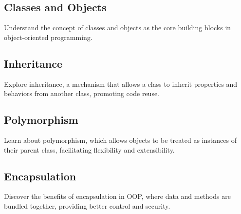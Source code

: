 \documentclass{article}
\begin{document}
\subsection{Classes and Objects}
Understand the concept of classes and objects as the core building blocks in object-oriented programming.

\subsection{Inheritance}
Explore inheritance, a mechanism that allows a class to inherit properties and behaviors from another class, promoting code reuse.

\subsection{Polymorphism}
Learn about polymorphism, which allows objects to be treated as instances of their parent class, facilitating flexibility and extensibility.

\subsection{Encapsulation}
Discover the benefits of encapsulation in OOP, where data and methods are bundled together, providing better control and security.
\end{document}
